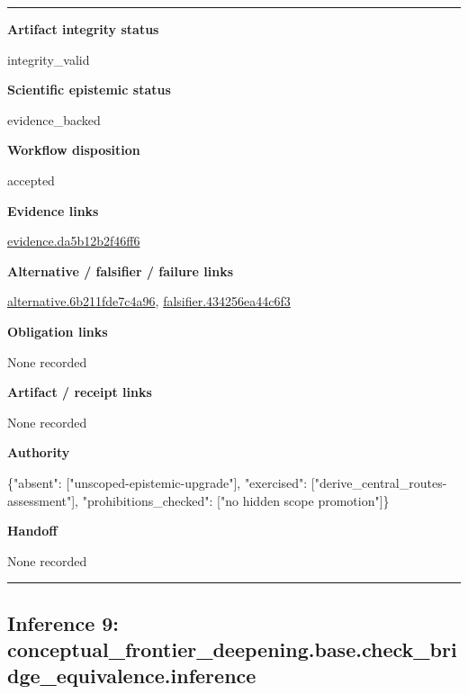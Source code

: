 \documentclass[10pt,a4paper]{article}
\newcommand{\TraceField}[2]{\par\noindent\textbf{#1}\par\noindent #2\par\smallskip}
\newenvironment{TraceDossier}{\par\medskip\noindent\hrule\medskip}{\medskip\hrule\par\medskip}
\begin{document}
\begin{TraceDossier}
\TraceField{Artifact integrity status}{integrity\_\allowbreak{}valid}

\TraceField{Scientific epistemic status}{evidence\_\allowbreak{}backed}

\TraceField{Workflow disposition}{accepted}

\TraceField{Evidence links}{\hyperlink{trace-evidence-3eb8e06ab75a41188f}{evidence.\allowbreak{}da5b12b2f4\allowbreak{}6ff6}}

\TraceField{Alternative / falsifier / failure links}{\hyperlink{trace-alternative-779461a24e9a7c6976}{alternativ\allowbreak{}e.\allowbreak{}6b211fde7c\allowbreak{}4a96}, \hyperlink{trace-alternative-28ae2ea4429ce5ef51}{falsifier.\allowbreak{}434256ea44\allowbreak{}c6f3}}

\TraceField{Obligation links}{None recorded}

\TraceField{Artifact / receipt links}{None recorded}

\TraceField{Authority}{\{"absent":\allowbreak{} ["unscoped\allowbreak{}-\allowbreak{}epistemic-\allowbreak{}upgrade"],\allowbreak{} "exercised\allowbreak{}":\allowbreak{} ["derive\_\allowbreak{}central\_\allowbreak{}routes-\allowbreak{}assessment\allowbreak{}"], "prohibiti\allowbreak{}ons\_\allowbreak{}checked":\allowbreak{} ["no hidden scope promotion"\allowbreak{}]\}}

\TraceField{Handoff}{None recorded}

\end{TraceDossier}
\pagebreak[2]\subsection{Inference 9: conceptual\allowbreak{}\_\allowbreak{}frontier\_\allowbreak{}deepening.\allowbreak{}base.\allowbreak{}check\_\allowbreak{}bridge\_\allowbreak{}equivalenc\allowbreak{}e.\allowbreak{}inference}\label{trace-inference-fb407c73dabfb8a674}
\end{document}
